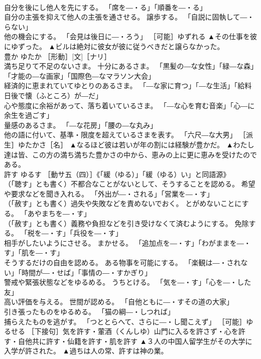 \documentclass[8pt]{extreport}
\begin{document}
\begin{CJK}{UTF8}{min}
\\	自分を後にし他人を先にする。 「席を―・る」「順番を―・る」 
\\	自分の主張を抑えて他人の主張を通させる。 譲歩する。 「自説に固執して―・らない」 
\\	他の機会にする。 「会見は後日に―・ろう」 ［可能］ゆずれる	▲その仕事を彼にゆずった。 ▲ビルは絶対に彼女が彼に従うべきだと譲らなかった。
\\	豊か	ゆたか	［形動］[文]［ナリ］ 
\\	満ち足りて不足のないさま。 十分にあるさま。 「黒髪の―な女性」「緑―な森」「才能の―な画家」「国際色―なマラソン大会」 
\\	経済的に恵まれていてゆとりのあるさま。 「―な家に育つ」「―な生活」「給料日後で懐（ふところ）が―だ」 
\\	心や態度に余裕があって、落ち着いているさま。 「―な心を育む音楽」「心―に余生を過ごす」 
\\	量感のあるさま。 「―な花房」「腰の―な丸み」 
\\	他の語に付いて、基準・限度を超えているさまを表す。 「六尺―な大男」 ［派生］ゆたかさ［名］	▲なるほど彼は若いが年の割には経験が豊かだ。 ▲わたし達は皆、この方の満ち満ちた豊かさの中から、恵みの上に更に恵みを受けたのである。
\\	許す	ゆるす	［動サ五（四）］《「緩（ゆる）」「緩（ゆる）い」と同語源》 
\\	（「聴す」とも書く）不都合なことがないとして、そうすることを認める。 希望や要求などを聞き入れる。 「外出が―・される」「営業を―・す」 
\\	（「赦す」とも書く）過失や失敗などを責めないでおく。 とがめないことにする。 「あやまちを―・す」 
\\	（「赦す」とも書く）義務や負担などを引き受けなくて済むようにする。 免除する。 「税を―・す」「兵役を―・す」 
\\	相手がしたいようにさせる。 まかせる。 「追加点を―・す」「わがままを―・す」「肌を―・す」 
\\	そうするだけの自由を認める。 ある物事を可能にする。 「楽観は―・されない」「時間が―・せば」「事情の―・すかぎり」 
\\	警戒や緊張状態などをゆるめる。 うちとける。 「気を―・す」「心を―・した友」 
\\	高い評価を与える。 世間が認める。 「自他ともに―・すその道の大家」 
\\	引き張ったものをゆるめる。 「猫の綱―・しつれば」 
\\	捕らえたものを逃がす。 「つととらへて、さらに―・し聞こえず」 ［可能］ゆるせる ［下接句］気を許す・葷酒（くんしゆ）山門に入るを許さず・心を許す・自他共に許す・仙籍を許す・肌を許す	▲３人の中国人留学生がその大学に入学が許された。 ▲過ちは人の常、許すは神の業。

\end{CJK}
\end{document}
